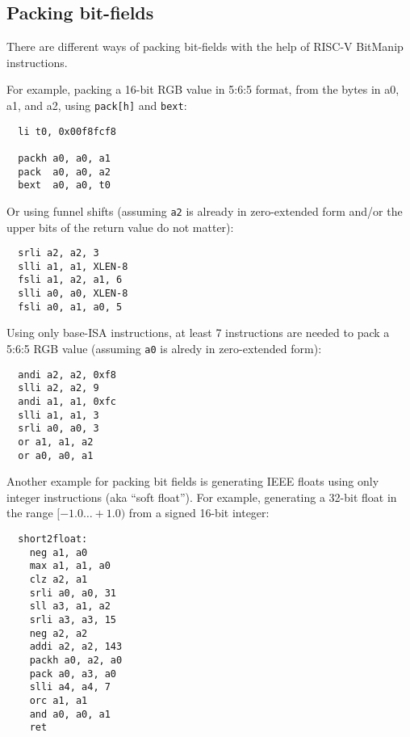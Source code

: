 
\subsection{Packing bit-fields}

There are different ways of packing bit-fields with the help of RISC-V BitManip
instructions.

For example, packing a 16-bit RGB value in 5:6:5 format, from the bytes
in a0, a1, and a2, using {\tt pack[h]} and {\tt bext}:

\begin{minipage}{\linewidth}
\begin{verbatim}
  li t0, 0x00f8fcf8

  packh a0, a0, a1
  pack  a0, a0, a2
  bext  a0, a0, t0
\end{verbatim}
\end{minipage}

Or using funnel shifts (assuming {\tt a2} is already in zero-extended form
and/or the upper bits of the return value do not matter):

\begin{minipage}{\linewidth}
\begin{verbatim}
  srli a2, a2, 3
  slli a1, a1, XLEN-8
  fsli a1, a2, a1, 6
  slli a0, a0, XLEN-8
  fsli a0, a1, a0, 5
\end{verbatim}
\end{minipage}

Using only base-ISA instructions, at least 7 instructions are needed to pack a
5:6:5 RGB value (assuming {\tt a0} is alredy in zero-extended form):

\begin{minipage}{\linewidth}
\begin{verbatim}
  andi a2, a2, 0xf8
  slli a2, a2, 9
  andi a1, a1, 0xfc
  slli a1, a1, 3
  srli a0, a0, 3
  or a1, a1, a2
  or a0, a0, a1
\end{verbatim}
\end{minipage}

Another example for packing bit fields is generating IEEE floats using
only integer instructions (aka ``soft float''). For example, generating
a 32-bit float in the range $[-1.0 \dots +1.0)$ from a signed 16-bit
integer:

\begin{minipage}{\linewidth}
\begin{verbatim}
  short2float:
    neg a1, a0
    max a1, a1, a0
    clz a2, a1
    srli a0, a0, 31
    sll a3, a1, a2
    srli a3, a3, 15
    neg a2, a2
    addi a2, a2, 143
    packh a0, a2, a0
    pack a0, a3, a0
    slli a4, a4, 7
    orc a1, a1
    and a0, a0, a1
    ret
\end{verbatim}
\end{minipage}

